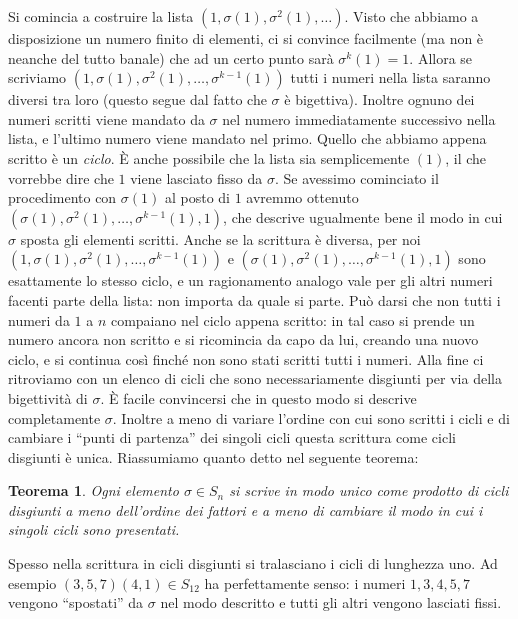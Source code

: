 \documentclass[11pt]{article}
\theoremstyle{plain}
\newtheorem{thm}{Teorema}[section]
\theoremstyle{definition}
\theoremstyle{remark}
\begin{document}
Si comincia a costruire la lista $(1, \sigma(1), \sigma^2(1), \dots)$. Visto che abbiamo a disposizione un numero finito di elementi,
ci si convince facilmente (ma non è neanche del tutto banale) che ad un certo punto sarà $\sigma^k(1) = 1$. Allora se scriviamo $(1, \sigma(1), \sigma^2(1), \dots, \sigma^{k-1}(1))$ tutti i numeri nella lista
saranno diversi tra loro (questo segue dal fatto che $\sigma$ è bigettiva). Inoltre ognuno dei numeri scritti viene mandato da $\sigma$
nel numero immediatamente successivo nella lista, e l'ultimo numero viene mandato nel primo. Quello che abbiamo appena scritto è un \emph{ciclo}.
\`E anche possibile che la lista sia semplicemente $(1)$, il che vorrebbe dire che $1$ viene lasciato fisso da $\sigma$.
Se avessimo cominciato il procedimento con $\sigma(1)$ al posto di $1$ avremmo ottenuto $(\sigma(1), \sigma^2(1), \dots, \sigma^{k-1}(1), 1)$, che
descrive ugualmente bene il modo in cui $\sigma$ sposta gli elementi scritti. Anche se la scrittura è diversa, per noi
$(1, \sigma(1), \sigma^2(1), \dots, \sigma^{k-1}(1))$ e $(\sigma(1), \sigma^2(1), \dots, \sigma^{k-1}(1), 1)$ sono esattamente lo stesso ciclo,
e un ragionamento analogo vale per gli altri numeri facenti parte della lista: non importa da quale si parte.
Può darsi che non tutti i numeri da $1$ a $n$ compaiano nel ciclo appena scritto: in tal caso si prende un numero ancora non scritto e si ricomincia da capo
da lui, creando una nuovo ciclo, e si continua così finché non sono stati scritti tutti i numeri.
Alla fine ci ritroviamo con un elenco di cicli che sono necessariamente disgiunti per via della bigettività di $\sigma$.
\`E facile convincersi che in questo modo si descrive completamente $\sigma$. Inoltre a meno di variare
l'ordine con cui sono scritti i cicli e di cambiare i ``punti di partenza'' dei singoli cicli questa scrittura come cicli disgiunti è unica.
Riassumiamo quanto detto nel seguente teorema:

\begin{thm}
Ogni elemento $\sigma \in S_n$ si scrive in modo unico come prodotto di cicli disgiunti a meno dell'ordine dei fattori e a meno di
cambiare il modo in cui i singoli cicli sono presentati.
\end{thm}

Spesso nella scrittura in cicli disgiunti si tralasciano i cicli di lunghezza uno. Ad esempio $(3,5,7)(4,1)\in S_{12}$ ha perfettamente senso:
i numeri $1,3,4,5,7$ vengono ``spostati'' da $\sigma$ nel modo descritto e tutti gli altri vengono lasciati fissi.
\end{document}
